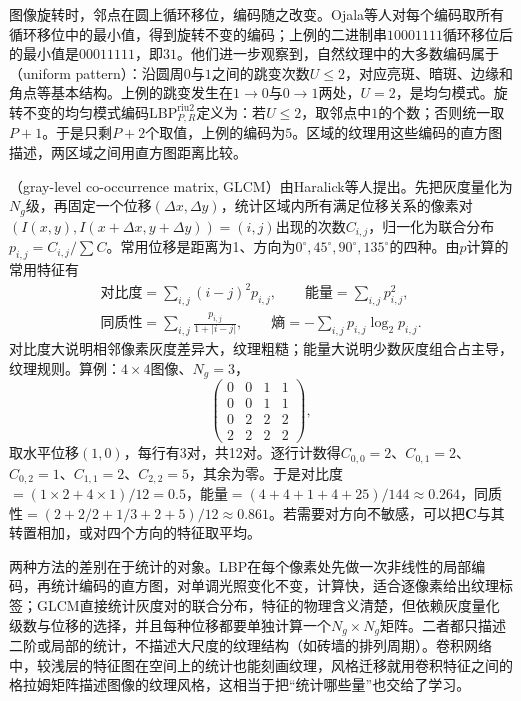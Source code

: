 图像旋转时，邻点在圆上循环移位，编码随之改变。Ojala等人对每个编码取所有循环移位中的最小值，得到旋转不变的编码；上例的二进制串$10001111$循环移位后的最小值是$00011111$，即$31$。他们进一步观察到，自然纹理中的大多数编码属于（uniform pattern）：沿圆周$0$与$1$之间的跳变次数$U\leq2$，对应亮斑、暗斑、边缘和角点等基本结构。上例的跳变发生在$1\to0$与$0\to1$两处，$U=2$，是均匀模式。旋转不变的均匀模式编码$\mathrm{LBP}^{\mathrm{riu2}}_{P,R}$定义为：若$U\leq2$，取邻点中$1$的个数；否则统一取$P+1$。于是只剩$P+2$个取值，上例的编码为$5$。区域的纹理用这些编码的直方图描述，两区域之间用直方图距离比较。

（gray-level co-occurrence matrix, GLCM）由Haralick等人提出。先把灰度量化为$N_g$级，再固定一个位移$(\Delta x,\Delta y)$，统计区域内所有满足位移关系的像素对$(I(x,y),I(x+\Delta x,y+\Delta y))=(i,j)$出现的次数$C_{i,j}$，归一化为联合分布$p_{i,j}=C_{i,j}/\sum C$。常用位移是距离为1、方向为$0^\circ,45^\circ,90^\circ,135^\circ$的四种。由$p$计算的常用特征有
\begin{gather*}
  \text{对比度}=\sum_{i,j}(i-j)^2p_{i,j},\qquad
  \text{能量}=\sum_{i,j}p_{i,j}^2,\\
  \text{同质性}=\sum_{i,j}\frac{p_{i,j}}{1+\lvert i-j\rvert},\qquad
  \text{熵}=-\sum_{i,j}p_{i,j}\log_2p_{i,j}.
\end{gather*}
对比度大说明相邻像素灰度差异大，纹理粗糙；能量大说明少数灰度组合占主导，纹理规则。算例：$4\times4$图像、$N_g=3$，
\[
  \begin{pmatrix}0&0&1&1\\0&0&1&1\\0&2&2&2\\2&2&2&2\end{pmatrix},
\]
取水平位移$(1,0)$，每行有3对，共12对。逐行计数得$C_{0,0}=2$、$C_{0,1}=2$、$C_{0,2}=1$、$C_{1,1}=2$、$C_{2,2}=5$，其余为零。于是对比度$=(1\times2+4\times1)/12=0.5$，能量$=(4+4+1+4+25)/144\approx0.264$，同质性$=(2+2/2+1/3+2+5)/12\approx0.861$。若需要对方向不敏感，可以把$\bm C$与其转置相加，或对四个方向的特征取平均。

两种方法的差别在于统计的对象。LBP在每个像素处先做一次非线性的局部编码，再统计编码的直方图，对单调光照变化不变，计算快，适合逐像素给出纹理标签；GLCM直接统计灰度对的联合分布，特征的物理含义清楚，但依赖灰度量化级数与位移的选择，并且每种位移都要单独计算一个$N_g\times N_g$矩阵。二者都只描述二阶或局部的统计，不描述大尺度的纹理结构（如砖墙的排列周期）。卷积网络中，较浅层的特征图在空间上的统计也能刻画纹理，风格迁移就用卷积特征之间的格拉姆矩阵描述图像的纹理风格，这相当于把“统计哪些量”也交给了学习。

